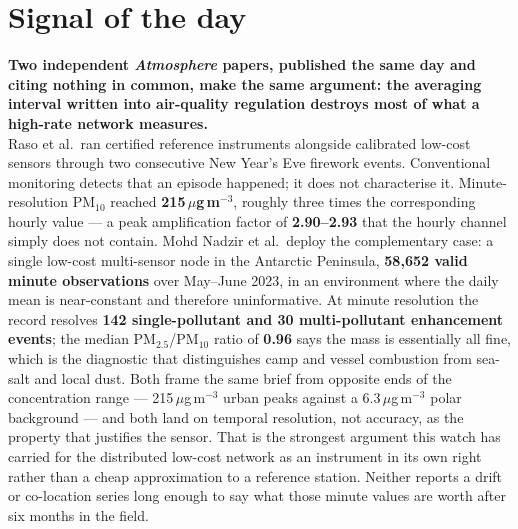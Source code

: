 \documentclass[10pt]{article}
\begin{document}
\vspace{6mm}

\section*{\sffamily\bfseries\color{Deep}Signal of the day}
\vspace{-1.5mm}{\color{Amber}\rule{\linewidth}{1.1pt}}\vspace{2.5mm}

\begin{keybox}
{\sffamily\bfseries\small\color{Deep}Two independent \textit{Atmosphere} papers, published
the same day and citing nothing in common, make the same argument: the averaging interval
written into air-quality regulation destroys most of what a high-rate network measures.}\\[1.4mm]
\footnotesize
Raso et al.\ ran certified reference instruments alongside calibrated low-cost sensors
through two consecutive New Year's Eve firework events. Conventional monitoring detects
that an episode happened; it does not characterise it. Minute-resolution PM$_{10}$ reached
\textbf{215\,$\mu$g\,m$^{-3}$}, roughly three times the corresponding hourly value ---
a peak amplification factor of \textbf{2.90--2.93} that the hourly channel simply does not
contain. Mohd Nadzir et al.\ deploy the complementary case: a single low-cost multi-sensor
node in the Antarctic Peninsula, \textbf{58{,}652 valid minute observations} over
May--June 2023, in an environment where the daily mean is near-constant and therefore
uninformative. At minute resolution the record resolves \textbf{142 single-pollutant and
30 multi-pollutant enhancement events}; the median PM$_{2.5}$/PM$_{10}$ ratio of
\textbf{0.96} says the mass is essentially all fine, which is the diagnostic that
distinguishes camp and vessel combustion from sea-salt and local dust.
Both frame the same brief from opposite ends of the concentration range ---
215\,$\mu$g\,m$^{-3}$ urban peaks against a 6.3\,$\mu$g\,m$^{-3}$ polar background ---
and both land on temporal resolution, not accuracy, as the property that justifies the
sensor. That is the strongest argument this watch has carried for the distributed low-cost
network as an instrument in its own right rather than a cheap approximation to a reference
station. Neither reports a drift or co-location series long enough to say what those
minute values are worth after six months in the field.
\end{keybox}
\end{document}
